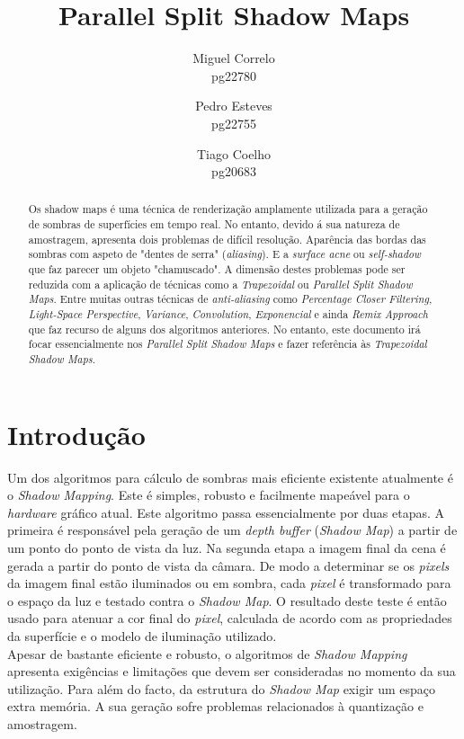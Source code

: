 \documentclass[12pt]{article}
\title{Parallel Split Shadow Maps}
\author{Miguel Correlo \\
\small{pg22780}\\
\and Pedro Esteves \\
\small{pg22755}\\
\and Tiago Coelho \\
\small{pg20683}}
\begin{document}
\maketitle

\begin{abstract}
Os shadow maps é uma técnica de renderização amplamente 
utilizada para a geração de sombras de superfícies em tempo real. No 
entanto, devido á sua natureza de amostragem, apresenta dois problemas de difícil 
resolução. Aparência das bordas das sombras com aspeto de "dentes de serra" ({\it aliasing}). E a {\it surface acne} ou {\it self-shadow} que faz parecer um objeto
"chamuscado". A dimensão destes problemas pode ser reduzida com a aplicação de técnicas como a {\it Trapezoidal} ou {\it Parallel Split Shadow Maps}. Entre muitas outras técnicas de {\it anti-aliasing} como {\it Percentage Closer Filtering}, {\it Light-Space Perspective}, {\it Variance}, {\it Convolution}, {\it Exponencial} e ainda {\it Remix Approach} que faz recurso de alguns dos algoritmos anteriores. No entanto, este documento irá focar essencialmente nos {\it Parallel Split Shadow Maps} e fazer referência às {\it Trapezoidal Shadow Maps}.


\end{abstract}

\section{Introdução}
\vspace{10 mm}
\hspace{8 mm}Um dos algoritmos para cálculo  de sombras mais eficiente existente atualmente é o {\it Shadow Mapping}. Este é simples, robusto e facilmente mapeável para o {\it hardware} gráfico atual. Este algoritmo passa essencialmente por duas etapas. A primeira é responsável pela geração de um {\it depth buffer} ({\it Shadow Map}) a partir de um ponto do ponto de vista da luz. Na segunda etapa a imagem final da cena é gerada a partir do ponto de vista da câmara. De modo a determinar se os {\it pixels} da imagem final estão iluminados ou em sombra, cada {\it pixel} é transformado para o espaço da luz e testado contra o {\it Shadow Map}. O resultado deste teste é então usado para atenuar a cor final do {\it pixel}, calculada de acordo com as propriedades da superfície e o modelo de iluminação utilizado.\\

Apesar de bastante eficiente e robusto, o algoritmos de {	\it Shadow Mapping} apresenta exigências e limitações que devem ser consideradas no momento da
sua utilização. Para além do facto, da estrutura do {\it Shadow Map} exigir um espaço extra memória. A sua geração sofre problemas relacionados à quantização e amostragem.\\
\end{document}
